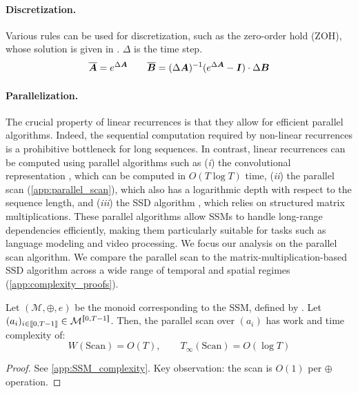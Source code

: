 \documentclass{article}
\newcommand{\greg}[1]{\par\noindent{\color{indigo}[Gregoire]: #1}\par}
\newcommand{\TS}[1]{\par\noindent{\color{red}[TS]: #1}\par}
\begin{document}
\paragraph{Discretization.} Various rules can be used for discretization, such as the zero-order hold (ZOH), whose solution is given in . $\Delta$ is the time step.
\begin{equation}
\label{eq:zoh}
\overline{\bm{A}} = e^{\Delta \bm{A}}
\qquad
\overline{\bm{B}} = (\Delta \bm{A})^{-1} (e^{\Delta \bm{\bm{A}}} - \bm{I}) \cdot \Delta \bm{B}
\end{equation}
\TS{$(\Delta \Amat)^{-1}$ assumes $\Amat$ invertible?}\greg{yes}
\paragraph{Parallelization.} The crucial property of linear recurrences is that they allow for efficient parallel algorithms. Indeed, the sequential computation required by non-linear recurrences is a prohibitive bottleneck for long sequences. In contrast, linear recurrences can be computed using parallel algorithms such as
%
(\emph{i}) the convolutional representation \citep{gu2022}, which can be computed in $O(T \log T)$ time,
%
(\emph{ii}) the parallel scan (\cref{app:parallel_scan}), which also has a logarithmic depth with respect to the sequence length, and
%
(\emph{iii}) the SSD algorithm \citep{dao2024}, which relies on structured matrix multiplications.
%
These parallel algorithms allow SSMs to handle long-range dependencies efficiently, making them particularly suitable for tasks such as language modeling and video processing. We focus our analysis on the parallel scan algorithm. We compare the parallel scan to the matrix-multiplication-based SSD algorithm \citep{dao2024} across a wide range of temporal and spatial regimes (\cref{app:complexity_proofs}).
\begin{proposition}
\label{prop:SSM_complexity}
    Let $(\mathcal{M}, \oplus, e)$ be the monoid corresponding to the SSM, defined by . Let $(a_i)_{i\in \llbracket 0, T-1 \rrbracket}\in \mathcal{M}^{\llbracket 0, T-1 \rrbracket}$. Then, the parallel scan over $(a_i)$ has work and time complexity of:
\[
    W(\mathrm{Scan}) = O(T), \qquad T_\infty(\mathrm{Scan}) = O(\log T)
\]
\end{proposition}
\begin{proof}
See \cref{app:SSM_complexity}. Key observation: the scan is $O(1)$ per $\oplus$ operation.
\end{proof}
\end{document}
